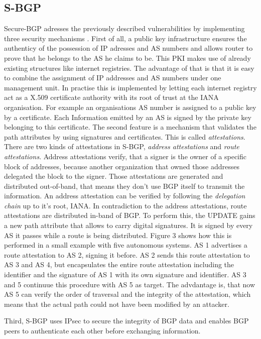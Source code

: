 \documentclass[12pt,a4paper]{IEEEtran}
\begin{document}
       \subsection{S-BGP}
       Secure-BGP adresses the previously described vulnerabilities by implementing three security mechanisms \citep{Kent2000a}. 
		First of all, a public key infrastructure ensures the authenticy of the possession of IP adresses and AS numbers and allows router to prove that he belongs to the AS he claims to be.
		This PKI makes use of already existing structures like internet registries. The advantage of that is that it is easy to combine the assignment of IP addresses and AS numbers under one management unit. 
		In practise this is implemented by letting each internet registry act as a X.509 certificate authority with its root of trust at the IANA organisation. For example an organisations AS number is assigned to a public key by a certificate. Each Information emitted by an AS is signed by the private key belonging to this certificate.
		The second feature is a mechanism that validates the path attributes by using signatures and certificates. This is called \emph{attestations}. There are two kinds of attestations in S-BGP, \emph{address attestations} and \emph{route attestations}. 
		Address attestations verify, that a signer is the owner of a specific block of addresses, because another organization that owned those addresses delegated the block to the signer. Those attestations are generated and distributed out-of-band, that means they don't use BGP itself to transmit the information. An address attestation can be verified by following the \emph{delegation chain} up to it's root, IANA.
		In contradiction to the address attestations, route attestations are distributed in-band of BGP. 		 To perform this, the UPDATE gains a new path attribute that allows to carry digital signatures. 
		It is signed by every AS it passes while a route is being distributed. Figure 3 shows how this is performed in a small example with five autonomous systems. AS 1 advertises a route attestation to AS 2, signing it before. AS 2 sends this route attestation to AS 3 and AS 4, but encapsulates the entire route attestation including the identifier and the signature of AS 1 with its own signature and identifier. AS 3 and 5 continuue this procedure with AS 5 as target. The advdantage is, that now AS 5 can verify the order of traversal and the integrity of the attestation, which means that the actual path could not have been modified by an attacker.

		Third, S-BGP uses IPsec to secure the integrity of BGP data and enables BGP peers to authenticate each other before exchanging information.
		
\end{document}
